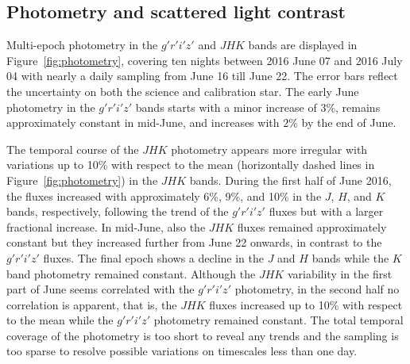 \documentclass[twocolumn,tighten]{aastex61}
\begin{document}
\subsection{Photometry and scattered light contrast}\label{sec:photometry}

Multi-epoch photometry in the $g'r'i'z'$ and $JHK$ bands are displayed in Figure~\ref{fig:photometry}, covering ten nights between 2016 June 07 and 2016 July 04 with nearly a daily sampling from June 16 till June 22. The error bars reflect the uncertainty on both the science and calibration star. The early June photometry in the $g'r'i'z'$ bands starts with a minor increase of $3\%$, remains approximately constant in mid-June, and increases with $2\%$ by the end of June.

The temporal course of the $JHK$ photometry appears more irregular with variations up to 10\% with respect to the mean (horizontally dashed lines in Figure~\ref{fig:photometry}) in the $JHK$ bands. During the first half of June 2016, the fluxes increased with approximately 6\%, 9\%, and 10\% in the $J$, $H$, and $K$ bands, respectively, following the trend of the $g'r'i'z'$ fluxes but with a larger fractional increase. In mid-June, also the $JHK$ fluxes remained approximately constant but they increased further from June 22 onwards, in contrast to the $g'r'i'z'$ fluxes. The final epoch shows a decline in the $J$ and $H$ bands while the $K$ band photometry remained constant. Although the $JHK$ variability in the first part of June seems correlated with the $g'r'i'z'$ photometry, in the second half no correlation is apparent, that is, the $JHK$ fluxes increased up to 10\% with respect to the mean while the $g'r'i'z'$ photometry remained constant. The total temporal coverage of the photometry is too short to reveal any trends and the sampling is too sparse to resolve possible variations on timescales less than one day.
\end{document}
